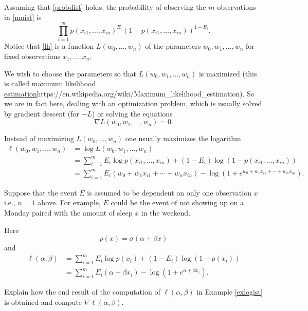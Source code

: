 \documentclass{article}
\begin{document}
Assuming that \eqref{probdist} holds, the probability of observing the
$m$ observations in \eqref{mnist} is
\begin{equation}\label{lh}
\prod_{i=1}^m p(x_{i1}, \dots, x_{in})^{E_i} (1 - p(x_{i1}, \dots, x_{in}))^{1-E_i}.
\end{equation}
Notice that \eqref{lh} is a function $L(w_0, \dots, w_n)$ of the
parameters $w_0, w_1, \dots, w_n$ for fixed observations $x_1,\dots, x_n$.

We wish to choose the parameters so that $L(w_0, w_1, \dots, w_n)$ is
maximized (this is called \url{maximum likelihood
  estimation}{https://en.wikipedia.org/wiki/Maximum_likelihood_estimation}).
So we are in fact here, dealing with an optimization problem, which is
usually solved by gradient descent (for $-L$) or solving the equations
$$
\nabla L (w_0, w_1, \dots, w_n) = 0.
$$
 
Instead of maximizing $L(w_0, \dots, w_n)$ one usually maximizes the logarithm
\begin{align*}
\ell(w_0, w_1, \dots, w_n) &= \log L(w_0, w_1, \dots, w_n)\\
                           &= \sum_{i=1}^m E_i \log p(x_{i1}, \dots, x_{in}) + (1 - E_i) \log ( 1 - p(x_{i1}, \dots, x_{in}))\\
  &= \sum_{i=1}^m E_i (w_0 + w_1 x_{i1} + \cdots + w_n x_{in}) -  \log (1 + e^{w_0 + w_1 x_{i1} + \cdots + w_n x_{in}}).
\end{align*}



\begin{example}\label{exlogist}
  Suppose that the event $E$ is assumed to be dependent on only one observation $x$ i.e., $n=1$ above.
  For example, $E$ could be the event of not showing up on a Monday paired with the amount of sleep
  $x$ in the weekend.
  
  Here
  $$
  p(x) = \sigma(\alpha + \beta x)
  $$
  and
  \begin{align*}
  \ell(\alpha, \beta) &= \sum_{i=1}^m E_i \log p(x_i) +
                        (1 - E_i)\log (1-p(x_i))\\
                      &= \sum_{i=1}^m E_i (\alpha + \beta x_i) - \log(1 + e^{\alpha + \beta x_i}).
  \end{align*}
\end{example}


\beginshex

Explain how the end result of the computation of $\ell(\alpha, \beta)$ in Example \ref{exlogist} is obtained and
compute $\nabla \ell (\alpha, \beta)$.
\endshex
\end{document}

